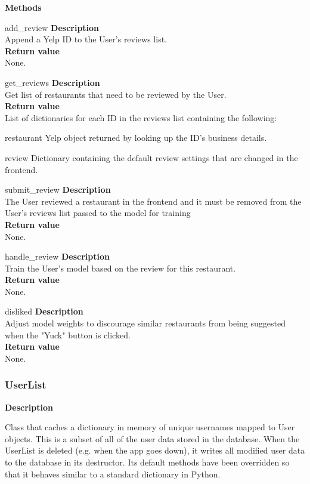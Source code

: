 \documentclass[11pt]{article}
\begin{document}
\textbf{Methods}
\begin{deflist}
	\item[add\_review]
		\textbf{Description}\\Append a Yelp ID to the User's reviews list.\\
		\textbf{Return value}\\None.
	\item[get\_reviews]
		\textbf{Description}\\Get list of restaurants that need to be reviewed by the User.\\
		\textbf{Return value}\\List of dictionaries for each ID in the reviews list containing the following: \begin{deflist}
			\item[restaurant] Yelp object returned by looking up the ID's business details.
			\item[review] Dictionary containing the default review settings that are changed in the frontend.
		\end{deflist}
	\item[submit\_review]
		\textbf{Description}\\The User reviewed a restaurant in the frontend and it must be removed from the User's reviews list passed to the model for training\\
		\textbf{Return value}\\None.
	\item[handle\_review]
	\textbf{Description}\\Train the User's model based on the review for this restaurant.\\
	\textbf{Return value}\\None.
	\item[disliked]
	\textbf{Description}\\Adjust model weights to discourage similar restaurants from being suggested when the "Yuck" button is clicked.\\
	\textbf{Return value}\\None.
\end{deflist}

\subsubsection{UserList}
\textbf{Description}

Class that caches a dictionary in memory of unique usernames mapped to User objects.
This is a subset of all of the user data stored in the database.
When the UserList is deleted (e.g. when the app goes down), it writes all modified user data to the database in its destructor.
Its default methods have been overridden so that it behaves similar to a standard dictionary in Python.
\end{document}

